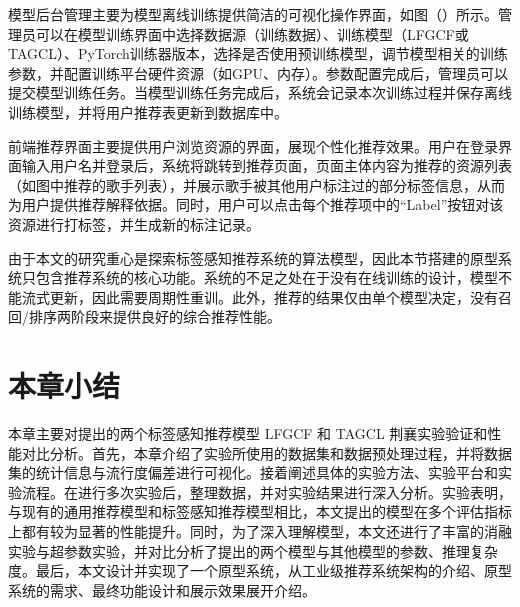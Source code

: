 模型后台管理主要为模型离线训练提供简洁的可视化操作界面，如图（）所示。管理员可以在模型训练界面中选择数据源（训练数据）、训练模型（LFGCF或TAGCL）、PyTorch训练器版本，选择是否使用预训练模型，调节模型相关的训练参数，并配置训练平台硬件资源（如GPU、内存）。参数配置完成后，管理员可以提交模型训练任务。当模型训练任务完成后，系统会记录本次训练过程并保存离线训练模型，并将用户推荐表更新到数据库中。

前端推荐界面主要提供用户浏览资源的界面，展现个性化推荐效果。用户在登录界面输入用户名并登录后，系统将跳转到推荐页面，页面主体内容为推荐的资源列表（如图中推荐的歌手列表），并展示歌手被其他用户标注过的部分标签信息，从而为用户提供推荐解释依据。同时，用户可以点击每个推荐项中的“Label”按钮对该资源进行打标签，并生成新的标注记录。

由于本文的研究重心是探索标签感知推荐系统的算法模型，因此本节搭建的原型系统只包含推荐系统的核心功能。系统的不足之处在于没有在线训练的设计，模型不能流式更新，因此需要周期性重训。此外，推荐的结果仅由单个模型决定，没有召回/排序两阶段来提供良好的综合推荐性能。

\section{本章小结}
本章主要对提出的两个标签感知推荐模型 LFGCF 和 TAGCL 荆襄实验验证和性能对比分析。首先，本章介绍了实验所使用的数据集和数据预处理过程，并将数据集的统计信息与流行度偏差进行可视化。接着阐述具体的实验方法、实验平台和实验流程。在进行多次实验后，整理数据，并对实验结果进行深入分析。实验表明，与现有的通用推荐模型和标签感知推荐模型相比，本文提出的模型在多个评估指标上都有较为显著的性能提升。同时，为了深入理解模型，本文还进行了丰富的消融实验与超参数实验，并对比分析了提出的两个模型与其他模型的参数、推理复杂度。最后，本文设计并实现了一个原型系统，从工业级推荐系统架构的介绍、原型系统的需求、最终功能设计和展示效果展开介绍。